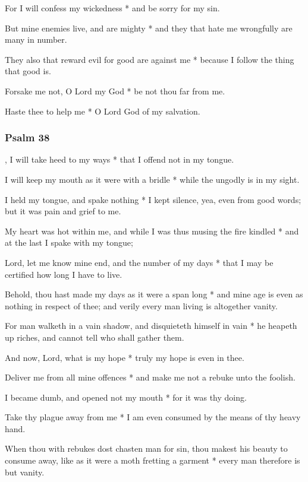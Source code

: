 For I will confess my wickedness * and be sorry for my sin.

But mine enemies live, and are mighty * and they that hate me wrongfully are many in number.

They also that reward evil for good are against me * because I follow the thing that good is.

Forsake me not, O Lord my God * be not thou far from me.

Haste thee to help me * O Lord God of my salvation.

\subsubsection{Psalm 38}


, I will take heed to my ways * that I offend not in my tongue.

I will keep my mouth as it were with a bridle * while the ungodly is in my sight.

I held my tongue, and spake nothing * I kept silence, yea, even from good words; but it was pain and grief to me.

My heart was hot within me, and while I was thus musing the fire kindled * and at the last I spake with my tongue;

Lord, let me know mine end, and the number of my days * that I may be certified how long I have to live.

Behold, thou hast made my days as it were a span long * and mine age is even as nothing in respect of thee; and verily every man living is altogether vanity.

For man walketh in a vain shadow, and disquieteth himself in vain * he heapeth up riches, and cannot tell who shall gather them.

And now, Lord, what is my hope * truly my hope is even in thee.

Deliver me from all mine offences * and make me not a rebuke unto the foolish.

I became dumb, and opened not my mouth * for it was thy doing.

Take thy plague away from me * I am even consumed by the means of thy heavy hand.

When thou with rebukes dost chasten man for sin, thou makest his beauty to consume away, like as it were a moth fretting a garment * every man therefore is but vanity.

